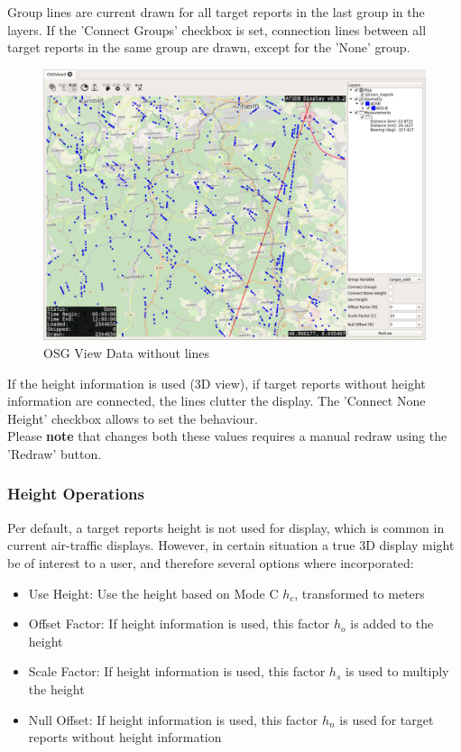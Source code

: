 {Group lines are current drawn for all target reports in the last group in the layers. If the 'Connect Groups' checkbox is set, connection lines between all target reports in the same group are drawn, except for the 'None' group.

\begin{figure}[H]
    \hspace*{-2cm}
    \includegraphics[width=18cm,frame]{../screenshots/osgview_no_lines.png}
  \caption{OSG View Data without lines}
\end{figure}

If the height information is used (3D view), if target reports without height information are connected, the lines clutter the display. The 'Connect None Height' checkbox allows to set the behaviour. \\

Please \textbf{note} that changes both these values requires a manual redraw using the 'Redraw' button.

\subsubsection{Height Operations}

Per default, a target reports height is not used for display, which is common in current air-traffic displays. However, in certain situation a true 3D display might be of interest to a user, and therefore several options where incorporated:

\begin{itemize}
 \item Use Height: Use the height based on Mode C $h_c$, transformed to meters
 \item Offset Factor: If height information is used, this factor $h_o$ is added to the height
 \item Scale Factor: If height information is used, this factor $h_s$ is used to multiply the height
 \item Null Offset: If height information is used, this factor $h_n$ is used for target reports without height information
\end{itemize}

}
